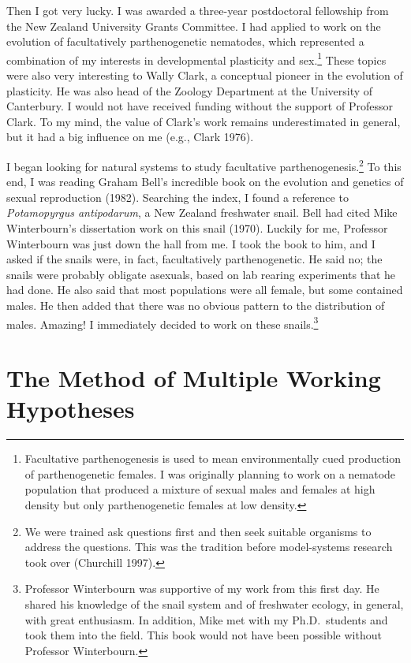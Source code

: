 \documentclass[
  letterpaper,
]{book}
\begin{document}
Then I got very lucky. I was awarded a three-year postdoctoral
fellowship from the New Zealand University Grants Committee. I had
applied to work on the evolution of facultatively parthenogenetic
nematodes, which represented a combination of my interests in
developmental plasticity and sex.\footnote{Facultative parthenogenesis
  is used to mean environmentally cued production of parthenogenetic
  females. I was originally planning to work on a nematode population
  that produced a mixture of sexual males and females at high density
  but only parthenogenetic females at low density.} These topics were
also very interesting to Wally Clark, a conceptual pioneer in the
evolution of plasticity. He was also head of the Zoology Department at
the University of Canterbury. I would not have received funding without
the support of Professor Clark. To my mind, the value of Clark's work
remains underestimated in general, but it had a big influence on me
(e.g., Clark 1976).

I began looking for natural systems to study facultative
parthenogenesis.\footnote{We were trained ask questions first and then
  seek suitable organisms to address the questions. This was the
  tradition before model-systems research took over (Churchill 1997).}
To this end, I was reading Graham Bell's incredible book on the
evolution and genetics of sexual reproduction (1982). Searching the
index, I found a reference to \emph{Potamopyrgus antipodarum}, a New
Zealand freshwater snail. Bell had cited Mike Winterbourn's dissertation
work on this snail (1970). Luckily for me, Professor Winterbourn was
just down the hall from me. I took the book to him, and I asked if the
snails were, in fact, facultatively parthenogenetic. He said no; the
snails were probably obligate asexuals, based on lab rearing experiments
that he had done. He also said that most populations were all female,
but some contained males. He then added that there was no obvious
pattern to the distribution of males. Amazing! I immediately decided to
work on these snails.\footnote{Professor Winterbourn was supportive of
  my work from this first day. He shared his knowledge of the snail
  system and of freshwater ecology, in general, with great enthusiasm.
  In addition, Mike met with my Ph.D.~students and took them into the
  field. This book would not have been possible without Professor
  Winterbourn.}

\section{The Method of Multiple Working
Hypotheses}\label{the-method-of-multiple-working-hypotheses}
\end{document}
